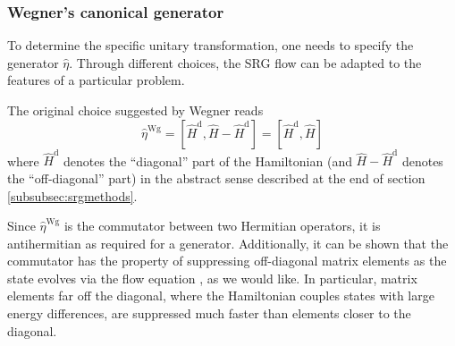 \documentclass[amsmath, amssymb, aps, floatfix, nofootinbib, preprintnumbers,showpacs, superscriptaddress, twocolumn]{revtex4-1}
\begin{document}
\subsubsection{Wegner's canonical generator}

To determine the specific unitary transformation, one needs to specify the generator $\hat{\eta}$.  Through different choices, the SRG flow can be adapted to the features of a particular problem.

The original choice suggested by Wegner \cite{PhysRepWegner0} reads
\begin{equation}
  \hat{\eta}^{\text{Wg}}
  = [\hat{H}^{\text{d}}, \hat{H} - \hat{H}^{\text{d}}]
  = [\hat{H}^{\text{d}}, \hat{H}]
  \label{eq:etaWegner}
\end{equation}
where $\hat{H}^{\text{d}}$ denotes the ``diagonal'' part of the Hamiltonian (and $\hat{H} - \hat{H}^{\text{d}}$ denotes the ``off-diagonal'' part) in the abstract sense described at the end of section \ref{subsubsec:srgmethods}.

Since $\hat{\eta}^{\text{Wg}}$ is the commutator between two Hermitian operators, it is antihermitian as required for a generator.  Additionally, it can be shown that the commutator has the property of suppressing off-diagonal matrix elements as the state evolves via the flow equation \cite{kehrein2006flow}, as we would like.  In particular, matrix elements far off the diagonal, where the Hamiltonian couples states with large energy differences, are suppressed much faster than elements closer to the diagonal.
\end{document}
